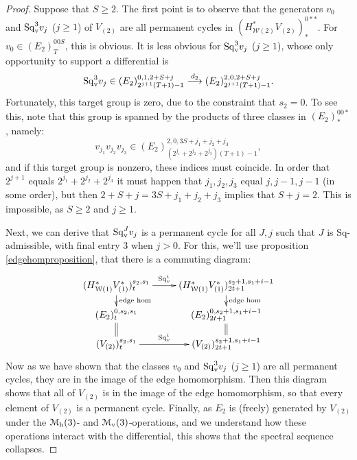 \documentclass[11pt]{amsart}
\theoremstyle{plain}
\theoremstyle{definition}
\renewcommand{\to}{\longrightarrow}
\newcommand{\calW}{\mathcal{W}}
\newcommand{\calmv}{\mathcal{M}_\textup{v}}
\newcommand{\calmh}{\mathcal{M}_\textup{h}}
\theoremstyle{plain}
\newcommand{\Sq}{\mathrm{Sq}}
\newcommand{\Sqv}{\mathrm{Sq}_\textup{v}}
\begin{document}
\begin{Calculations of HWn for n nonzero}
\begin{proof}
Suppose that $S\geq2$. The first point is to observe that the generators $v_0$ and $\Sqv^3v_j$ ($j\geq1$) of $V_{(2)}$ are all permanent cycles in
$(H^*_{\calW(2)}V_{(2)})^{0**}_{*}$. For $v_0\in (E_2)^{00S}_{T}$, this is obvious. It is less obvious for $\Sqv^3v_j$ ($j\geq1$), whose only opportunity to support a differential is
\[\Sqv^3v_j\in (E_2)^{0,1,2+S+j}_{2^{j+1}(T+1)-1}\overset{d_2}{\to}(E_2)^{2,0,2+S+j}_{2^{j+1}(T+1)-1}.\]
Fortunately, this target group is zero, due to the constraint that $s_2=0$. To see this, note that this group is spanned by the products of three classes in $(E_{2})^{00*}_*$, namely:
\[v_{j_1}v_{j_2}v_{j_3}\in (E_{2})^{2,0,3S+j_1+j_2+j_3}_{(2^{j_1}+2^{j_2}+2^{j_3})(T+1)-1},\]
and if this target group is nonzero, these indices must coincide.
In order that $2^{j+1}$ equals $2^{j_{1}}+2^{j_{2}}+2^{j_{3}}$ it must happen that $j_1,j_2,j_3$ equal $j,j-1,j-1$ (in some order), but then $2+S+j=3S+j_1+j_2+j_3$ implies that $S+j=2$. This is impossible, as $S\geq2$ and $j\geq1$.

Next, we can derive that $\Sqv^Jv_j$ is a permanent cycle for all $J,j$ such that $J$ is $\Sq$-admissible, with final entry 3 when $j>0$. For this, we'll use  proposition \ref{edgehomproposition}, that there is a commuting diagram:%
\[\xymatrix@R=4mm{
(H^*_{\calW(1)}V^*_{(1)})^{s_{2},s_1}_t\ar[r]^-{\Sqv^i}
\ar[d]^-{\textup{edge hom}}
&%
(H^*_{\calW(1)}V^*_{(1)})^{s_{2}+1,s_1+i-1}_{2t+1}\ar[d]^-{\textup{edge hom}}
\\%
(E_{2})^{0,s_{2},s_1}_t\ar@{=}[d]%
&%
(E_2)^{0,s_{2}+1,s_1+i-1}_{2t+1}\ar@{=}[d]\\
(V_{(2)})^{s_{2},s_1}_t\ar[r]^-{\Sqv^i}
&%
(V_{(2)})^{s_{2}+1,s_1+i-1}_{2t+1}
}\]
Now as we have shown that the classes $v_0$ and $\Sqv^{3}v_j$  ($j\geq1$) are all permanent cycles, they are in the image of the edge homomorphism. Then this diagram shows that all of $V_{(2)}$ is in the image of the edge homomorphism, so that every element  of $V_{(2)}$ is a permanent cycle. Finally, as $E_{2}$ is (freely) generated by $V_{(2)}$ under the $\calmh(3)$- and $\calmv(3)$-operations, and we understand how these operations interact with the differential, this shows that the spectral sequence collapses.


\end{proof}
\end{Calculations of HWn for n nonzero}
\end{document}
